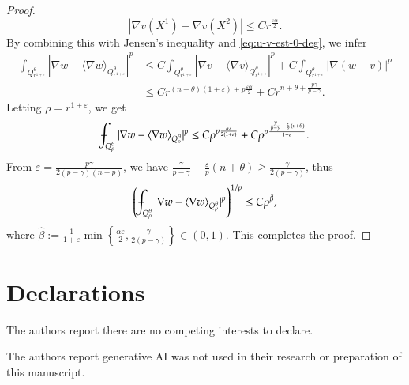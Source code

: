 \documentclass[11pt,oneside,english]{amsart}
\newcommand{\e}{\varepsilon}
\newcommand{\al}{\alpha}
\newcommand{\be}{\beta}
\newcommand{\D}{\nabla}
\numberwithin{equation}{section}
\def\Xint#1{\mathchoice
  {\XXint\displaystyle\textstyle{#1}}%
  {\XXint\textstyle\scriptstyle{#1}}%
  {\XXint\scriptstyle\scriptscriptstyle{#1}}%
  {\XXint\scriptscriptstyle\scriptscriptstyle{#1}}%
  \!\int}
\def\XXint#1#2#3{{\setbox0=\hbox{$#1{#2#3}{\int}$}
    \vcenter{\hbox{$#2#3$}}\kern-.5\wd0}}
\def\dashint{\Xint-}
\theoremstyle{plain}
\numberwithin{equation}{section}
\newcommand{\mean}[1]{\langle{#1}\rangle}
\begin{document}
\begin{proof}
$$
|\D v(X^1)-\D v(X^2)|\le Cr^{\frac{\e\al}2}.
$$
By combining this with Jensen's inequality and \eqref{eq:u-v-est-0-deg}, we infer
\begin{align*}
    \int_{Q^\theta_{r^{1+\e}}}|\D w-\mean{\D w}_{Q^\theta_{r^{1+\e}}}|^p&\le C\int_{Q^\theta_{r^{1+\e}}}|\D v-\mean{\D v}_{Q^\theta_{r^{1+\e}}}|^p+C\int_{Q^\theta_{r^{1+\e}}}|\D(w-v)|^p \\
    &\le Cr^{(n+\theta)(1+\e)+p\frac{\e\al}2}+Cr^{n+\theta+\frac{p\gamma}{p-\gamma}}.
\end{align*}
Letting $\rho=r^{1+\e}$, we get
$$
\dashint_{Q_\rho^\theta}|\D w-\mean{\D w}_{Q_\rho^\theta}|^p\le C\rho^{p\frac{\al\e}{2(1+\e)}}+C\rho^{p\frac{\frac{\gamma}{p-\gamma}-\frac\e p(n+\theta) }{1+\e}}.
$$
From $\e=\frac{p\gamma}{2(p-\gamma)(n+p)}$, we have $\frac{\gamma}{p-\gamma}-\frac{\e}p(n+\theta)\ge\frac{\gamma}{2(p-\gamma)}$, thus
$$
\left(\dashint_{Q_\rho^\theta}|\D w-\mean{\D w}_{Q_\rho^\theta}|^p\right)^{1/p}\le C\rho^{\hat\be},
$$
where $\hat\be:=\frac1{1+\e}\min\left\{\frac{\al\e}2,\frac{\gamma}{2(p-\gamma)}\right\}\in(0,1)$. This completes the proof.    
\end{proof}



\section*{Declarations}

  The authors report there are no competing interests to declare.

\medskip
{}  The authors report generative AI was not used in their research or preparation of this manuscript.















\end{document}
